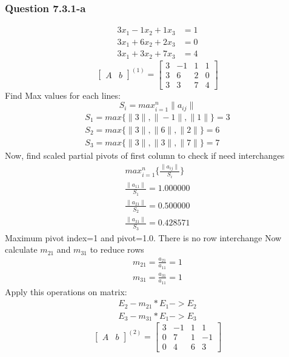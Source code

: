 \documentclass{article}
\begin{document}
\subsubsection{Question 7.3.1-a}
\begin{align}
\label{q7.3.1.a.1}3x_{1}-1x_{2}+1x_{3}&=1 \\
\label{q7.3.1.a.2}3x_{1}+6x_{2}+2x_{3}&=0 \\
\label{q7.3.1.a.3}3x_{1}+3x_{2}+7x_{3}&=4
\end{align}
\[
\left[
\begin{array}{c|c}
A&b
\end{array}
\right]^{(1)}
=
\left[
\begin{array}{ccc|c}
	3&-1&1&1\\
	3&6&2&0\\
	3&3&7&4 
\end{array}
\right]
\]
Find Max values for each lines: 
\begin{equation}
\label{findSMax}S_{i}=max_{i=1}^n\|a_{ij}\|
\end{equation}
\begin{align}
	S_{1}=max\{\|3\|,\|-1\|,\|1\|\}=3\\
	S_{2}=max\{\|3\|,\|6\|,\|2\|\}=6\\
	S_{3}=max\{\|3\|,\|3\|,\|7\|\}=7
\end{align}
Now, find scaled partial pivots of first column to check if need interchanges
\begin{align}
	max_{i=1}^n\{\frac{\|a_{ij}\|}{S_{i}}\}\\
	\frac{\|a_{11}\|}{S_{1}}=1.000000\\
	\frac{\|a_{21}\|}{S_{2}}=0.500000\\
	\frac{\|a_{31}\|}{S_{3}}=0.428571
\end{align}
Maximum pivot index=1 and pivot=1.0. There is no row interchange
Now calculate $m_{21}$ and $m_{31}$ to reduce rows 
\begin{align}
	m_{21}=\frac{a_{21}}{a_{11}}=1\\
	m_{31}=\frac{a_{31}}{a_{11}}=1
\end{align}
Apply this operations on matrix:
\begin{align}
	E_{2}-m_{21}*E_{1}->E_{2}\\
	E_{3}-m_{31}*E_{1}->E_{3}
\end{align}
\[
\left[
\begin{array}{c|c}
A&b
\end{array}
\right]^{(2)}
=
\left[
\begin{array}{ccc|c}
	3&-1&1&1\\
	0&7&1&-1\\
	0&4&6&3 
\end{array}
\right]
\]
\end{document}
